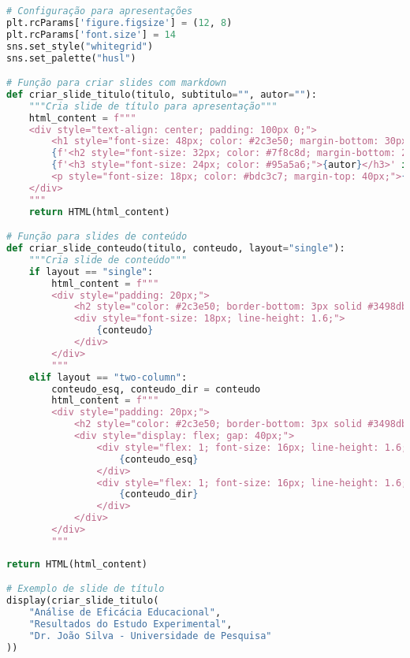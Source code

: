 \begin{pythonbox}
\begin{lstlisting}[language=Python]
# Configuração para apresentações
plt.rcParams['figure.figsize'] = (12, 8)
plt.rcParams['font.size'] = 14
sns.set_style("whitegrid")
sns.set_palette("husl")

# Função para criar slides com markdown
def criar_slide_titulo(titulo, subtitulo="", autor=""):
    """Cria slide de título para apresentação"""
    html_content = f"""
    <div style="text-align: center; padding: 100px 0;">
        <h1 style="font-size: 48px; color: #2c3e50; margin-bottom: 30px;">{titulo}</h1>
        {f'<h2 style="font-size: 32px; color: #7f8c8d; margin-bottom: 20px;">{subtitulo}</h2>' if subtitulo else ''}
        {f'<h3 style="font-size: 24px; color: #95a5a6;">{autor}</h3>' if autor else ''}
        <p style="font-size: 18px; color: #bdc3c7; margin-top: 40px;">{datetime.now().strftime('%d de %B de %Y')}</p>
    </div>
    """
    return HTML(html_content)

# Função para slides de conteúdo
def criar_slide_conteudo(titulo, conteudo, layout="single"):
    """Cria slide de conteúdo"""
    if layout == "single":
        html_content = f"""
        <div style="padding: 20px;">
            <h2 style="color: #2c3e50; border-bottom: 3px solid #3498db; padding-bottom: 10px; margin-bottom: 30px;">{titulo}</h2>
            <div style="font-size: 18px; line-height: 1.6;">
                {conteudo}
            </div>
        </div>
        """
    elif layout == "two-column":
        conteudo_esq, conteudo_dir = conteudo
        html_content = f"""
        <div style="padding: 20px;">
            <h2 style="color: #2c3e50; border-bottom: 3px solid #3498db; padding-bottom: 10px; margin-bottom: 30px;">{titulo}</h2>
            <div style="display: flex; gap: 40px;">
                <div style="flex: 1; font-size: 16px; line-height: 1.6;">
                    {conteudo_esq}
                </div>
                <div style="flex: 1; font-size: 16px; line-height: 1.6;">
                    {conteudo_dir}
                </div>
            </div>
        </div>
        """
   \end{lstlisting}
\end{pythonbox}

\begin{pythonbox}
\begin{lstlisting}[language=Python]           
    return HTML(html_content)

# Exemplo de slide de título
display(criar_slide_titulo(
    "Análise de Eficácia Educacional",
    "Resultados do Estudo Experimental",
    "Dr. João Silva - Universidade de Pesquisa"
))
\end{lstlisting}
\end{pythonbox}

